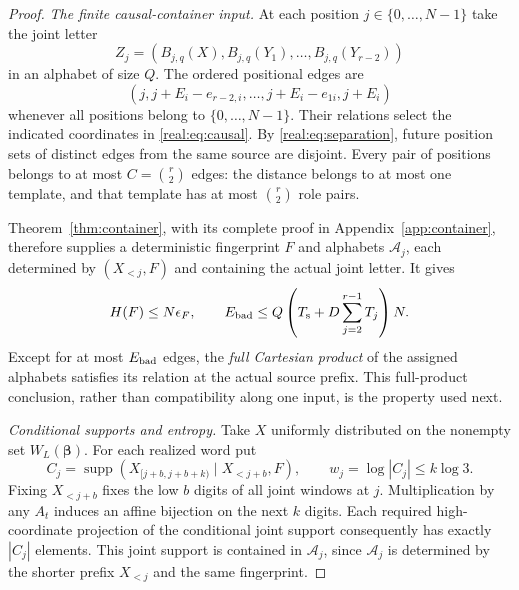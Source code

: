 \documentclass[11pt]{article}
\theoremstyle{definition}
\theoremstyle{remark}
\newcommand{\supp}{\operatorname{supp}}
\begin{document}
\begin{proof}
\emph{The finite causal-container input.}
At each position $j\in\{0,\ldots,N-1\}$ take the joint letter
\[
 Z_j=(B_{j,q}(X),B_{j,q}(Y_1),\ldots,B_{j,q}(Y_{r-2}))
\]
in an alphabet of size $Q$. The ordered positional edges are
\[
 (j,j+E_i-e_{r-2,i},\ldots,j+E_i-e_{1i},j+E_i)
\]
whenever all positions belong to $\{0,\ldots,N-1\}$.
Their relations select the indicated coordinates in \eqref{real:eq:causal}.
By \eqref{real:eq:separation}, future position sets of distinct edges from
the same source are disjoint. Every pair of positions belongs to at
most $C=\binom r2$ edges: the distance belongs to at most one template,
and that template has at most $\binom r2$ role pairs.

Theorem~\ref{thm:container}, with its complete proof in
Appendix~\ref{app:container}, therefore supplies a deterministic
fingerprint $F$ and alphabets $\mathcal A_j$, each determined by
$(X_{<j},F)$ and containing the actual joint letter. It gives
\begin{equation}\label{real:eq:budgets}
 H(F)\le N\epsilon_F,\qquad
 E_{\rm bad}\le Q\left(T_{\rm s}+D\sum_{j=2}^{r-1}T_j\right)N.
\end{equation}
Except for at most $E_{\rm bad}$ edges, the \emph{full Cartesian product}
of the assigned alphabets satisfies its relation at the actual source
prefix. This full-product conclusion, rather than compatibility along
one input, is the property used next.

\emph{Conditional supports and entropy.}
Take $X$ uniformly distributed on the nonempty set
$W_L(\boldsymbol\beta)$. For each realized word put
\[
 C_j=\supp(X_{[j+b,j+b+k)}\mid X_{<j+b},F),\qquad
 w_j=\log|C_j|\le k\log3.
\]
Fixing $X_{<j+b}$ fixes the low $b$ digits of all joint windows at $j$.
Multiplication by any $A_t$ induces an affine bijection on the next
$k$ digits. Each required high-coordinate projection of the conditional
joint support consequently has exactly $|C_j|$ elements. This joint
support is contained in $\mathcal A_j$, since $\mathcal A_j$ is determined
by the shorter prefix $X_{<j}$ and the same fingerprint.


\end{proof}
\end{document}
